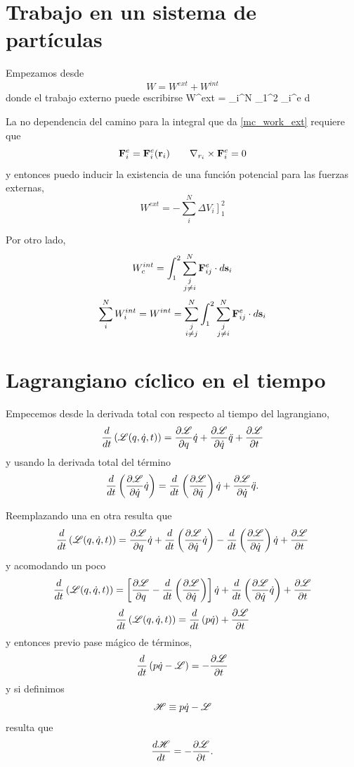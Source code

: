\documentclass[10pt,oneside]{CBFT_article}
\begin{document}
\section{Trabajo en un sistema de partículas}

Empezamos desde
\[
W = W^{ext} + W^{int}
\]
donde el trabajo externo puede escribirse
\be
W^{ext} = \sum_i^N \int_1^2 _i^e \cdot d
\label{mc_work_ext}
\ee

La no dependencia del camino para la integral que da \eqref{mc_work_ext} requiere que 
\[
\vb{F}_i^e = \vb{F}_i^e( \vb{r}_i ) \qquad \nabla_{r_i} \times \vb{F}_i^e = 0
\]
y entonces puedo inducir la existencia de una función potencial para las fuerzas externas,
\[
W^{ext} = - \sum_i^N  \left. \Delta V_i \right]_1^2 
\]

Por otro lado,
\[
W^{int}_c = \int_1^2 \sum_{\substack{j\\j\neq i}}^N  \vb{F}_{ij}^e \cdot d\vb{s}_i  
\]
\[
\sum_i^N W_i^{int} =  W^{int} = \sum_{\substack{j \\ i\neq j}}^N  \int_1^2 \sum_{\substack{j \\ j\neq i}}^N  \vb{F}_{ij}^e \cdot 
d\vb{s}_i  
\]

\section{Lagrangiano cíclico en el tiempo}

Empecemos desde la derivada total con respecto al tiempo del lagrangiano,
\[
\frac{d}{dt}\left( \Lag( q, \dot{q}, t)\right) = \dpar{\Lag}{q} \dot{q} + \dpar{\Lag}{\dot{q}} \ddot{q} + \dpar{\Lag}{t}
\]
y usando la derivada total del término 
\[
\frac{d}{dt}\left( \dpar{\Lag}{\dot{q}}\dot{q}\right) =
\frac{d}{dt}\left( \dpar{\Lag}{\dot{q}} \right) \dot{q} + \dpar{\Lag}{\dot{q}} \ddot{q} .
\]

Reemplazando una en otra resulta que 
\[
\frac{d}{dt}\left( \Lag( q, \dot{q}, t)\right) = \dpar{\Lag}{q} \dot{q} + \frac{d}{dt}\left( \dpar{\Lag}{\dot{q}}\dot{q}\right) -
\frac{d}{dt}\left( \dpar{\Lag}{\dot{q}} \right) \dot{q} + \dpar{\Lag}{t}
\]
y acomodando un poco
\[
\frac{d}{dt}\left( \Lag( q, \dot{q}, t)\right) = 
\left[ \dpar{\Lag}{q}  - \frac{d}{dt}\left( \dpar{\Lag}{\dot{q}} \right) \right] \dot{q} + 
\frac{d}{dt}\left( \dpar{\Lag}{\dot{q}}\dot{q}\right)  + \dpar{\Lag}{t}
\]
\[
\frac{d}{dt}\left( \Lag( q, \dot{q}, t)\right) = \frac{d}{dt}\left( p \dot{q} \right) + \dpar{\Lag}{t}
\]
y entonces previo pase mágico de términos,
\[
\frac{d}{dt}\left( p\dot{q} - \Lag \right) = -\dpar{\Lag}{t}
\]
y si definimos
\[
\Ham \equiv p\dot{q} - \Lag 
\]
resulta que 
\[
\dtot{\Ham}{t} = - \dpar{\Lag}{t}.
\]
\end{document}
